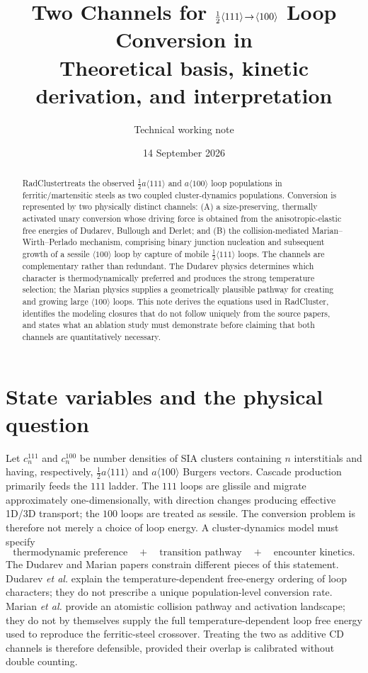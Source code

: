 \documentclass[11pt,a4paper]{article}
\title{\vspace{-1.4cm}\textbf{Two Channels for $\half\hkl{111}\!\rightarrow\!\hkl{100}$ Loop Conversion in \rc}\\[3pt]
\large Theoretical basis, kinetic derivation, and interpretation}
\author{Technical working note}
\date{14 September 2026}
\newcommand{\hkl}[1]{\langle #1\rangle}
\newcommand{\half}{\tfrac12}
\newcommand{\rc}{\textsf{RadCluster}}
\begin{document}
\maketitle
\vspace{-1.0em}

\begin{abstract}
\rc treats the observed $\half a\hkl{111}$ and $a\hkl{100}$ loop populations in ferritic/martensitic steels as two coupled cluster-dynamics populations.  Conversion is represented by two physically distinct channels: (A) a size-preserving, thermally activated unary conversion whose driving force is obtained from the anisotropic-elastic free energies of Dudarev, Bullough and Derlet; and (B) the collision-mediated Marian--Wirth--Perlado mechanism, comprising binary junction nucleation and subsequent growth of a sessile $\hkl{100}$ loop by capture of mobile $\half\hkl{111}$ loops.  The channels are complementary rather than redundant.  The Dudarev physics determines which character is thermodynamically preferred and produces the strong temperature selection; the Marian physics supplies a geometrically plausible pathway for creating and growing large $\hkl{100}$ loops.  This note derives the equations used in \rc, identifies the modeling closures that do not follow uniquely from the source papers, and states what an ablation study must demonstrate before claiming that both channels are quantitatively necessary.
\end{abstract}

\section{State variables and the physical question}

Let $c_n^{111}$ and $c_n^{100}$ be number densities of SIA clusters containing $n$ interstitials and having, respectively, $\half a\hkl{111}$ and $a\hkl{100}$ Burgers vectors.  Cascade production primarily feeds the $111$ ladder.  The $111$ loops are glissile and migrate approximately one-dimensionally, with direction changes producing effective 1D/3D transport; the $100$ loops are treated as sessile.  The conversion problem is therefore not merely a choice of loop energy.  A cluster-dynamics model must specify
\begin{equation}
  \text{thermodynamic preference}\quad+\quad
  \text{transition pathway}\quad+\quad
  \text{encounter kinetics}.
\end{equation}
The Dudarev and Marian papers constrain different pieces of this statement.  Dudarev \emph{et al.} explain the temperature-dependent free-energy ordering of loop characters; they do not prescribe a unique population-level conversion rate.  Marian \emph{et al.} provide an atomistic collision pathway and activation landscape; they do not by themselves supply the full temperature-dependent loop free energy used to reproduce the ferritic-steel crossover.  Treating the two as additive CD channels is therefore defensible, provided their overlap is calibrated without double counting.
\end{document}
